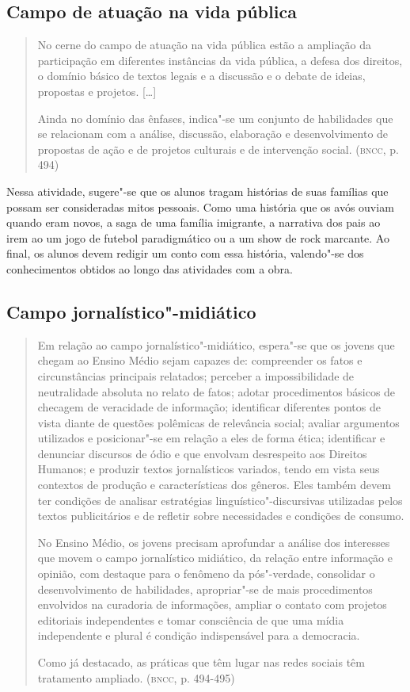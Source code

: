 \documentclass[12pt]{extarticle}
\begin{document}
\subsection{Campo de atuação na vida pública}

\begin{quote}
No cerne do campo de atuação na vida pública estão a ampliação da
participação em diferentes instâncias da vida pública, a defesa dos
direitos, o domínio básico de textos legais e a discussão e o debate de
ideias, propostas e projetos. {[}\ldots{}{]}

Ainda no domínio das ênfases, indica"-se um conjunto de habilidades que
se relacionam com a análise, discussão, elaboração e desenvolvimento de
propostas de ação e de projetos culturais e de intervenção social.
(\textsc{bncc}, p. 494)
\end{quote}

  Nessa atividade, sugere"-se que os alunos tragam histórias de suas
  famílias que possam ser consideradas mitos pessoais. Como uma história
  que os avós ouviam quando eram novos, a saga de uma família imigrante,
  a narrativa dos pais ao irem ao um jogo de futebol paradigmático ou a
  um show de rock marcante. Ao final, os alunos devem redigir um conto
  com essa história, valendo"-se dos conhecimentos obtidos ao longo das
  atividades com a obra.

\subsection{Campo jornalístico"-midiático}

\begin{quote}
Em relação ao campo jornalístico"-midiático, espera"-se que os jovens
que chegam ao Ensino Médio sejam capazes de: compreender os fatos e
circunstâncias principais relatados; perceber a impossibilidade de
neutralidade absoluta no relato de fatos; adotar procedimentos básicos
de checagem de veracidade de informação; identificar diferentes pontos
de vista diante de questões polêmicas de relevância social; avaliar
argumentos utilizados e posicionar"-se em relação a eles de forma ética;
identificar e denunciar discursos de ódio e que envolvam desrespeito aos
Direitos Humanos; e produzir textos jornalísticos variados, tendo em
vista seus contextos de produção e características dos gêneros. Eles
também devem ter condições de analisar estratégias
linguístico"-discursivas utilizadas pelos textos publicitários e de
refletir sobre necessidades e condições de consumo.

No Ensino Médio, os jovens precisam aprofundar a análise dos interesses
que movem o campo jornalístico midiático, da relação entre informação e
opinião, com destaque para o fenômeno da pós"-verdade, consolidar o
desenvolvimento de habilidades, apropriar"-se de mais procedimentos
envolvidos na curadoria de informações, ampliar o contato com projetos
editoriais independentes e tomar consciência de que uma mídia
independente e plural é condição indispensável para a democracia.

Como já destacado, as práticas que têm lugar nas redes sociais têm
tratamento ampliado. (\textsc{bncc}, p. 494-495)
\end{quote}
\end{document}
